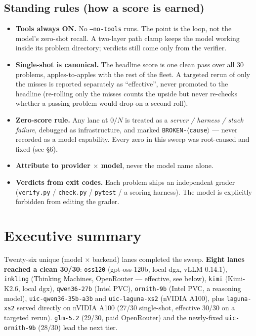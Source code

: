 \documentclass[11pt]{article}
\begin{document}
\subsection*{Standing rules (how a score is earned)}
\begin{itemize}
\item \textbf{Tools always ON.} No \texttt{--no-tools} runs. The point is the loop,
  not the model's zero-shot recall. A two-layer path clamp keeps the model working
  inside its problem directory; verdicts still come only from the verifier.
\item \textbf{Single-shot is canonical.} The headline score is one clean pass over
  all 30 problems, apples-to-apples with the rest of the fleet. A targeted rerun of
  only the misses is reported separately as ``effective'', never promoted to the
  headline (re-rolling only the misses counts the upside but never re-checks whether
  a passing problem would drop on a second roll).
\item \textbf{Zero-score rule.} Any lane at $0/N$ is treated as a
  \emph{server / harness / stack failure}, debugged as infrastructure, and marked
  \texttt{BROKEN-$\langle$cause$\rangle$} --- never recorded as a model capability.
  Every zero in this sweep was root-caused and fixed (see \S6).
\item \textbf{Attribute to provider $\times$ model}, never the model name alone.
\item \textbf{Verdicts from exit codes.} Each problem ships an independent grader
  (\texttt{verify.py} / \texttt{check.py} / \texttt{pytest} / a scoring harness). The
  model is explicitly forbidden from editing the grader.
\end{itemize}

\section{Executive summary}

Twenty-six unique (model $\times$ backend) lanes completed the sweep. \textbf{Eight
lanes reached a clean 30/30}: \texttt{oss120} (gpt-oss-120b, local dgx, vLLM 0.14.1),
\texttt{inkling} (Thinking Machines, OpenRouter --- effective, see below),
\texttt{kimi} (Kimi-K2.6, local dgx), \texttt{qwen36-27b} (Intel PVC), \texttt{ornith-9b}
(Intel PVC, a reasoning model), \texttt{uic-qwen36-35b-a3b} and
\texttt{uic-laguna-xs2} (nVIDIA A100), plus \texttt{laguna-xs2} served directly on nVIDIA A100
(27/30 single-shot, effective 30/30 on a targeted rerun). \texttt{glm-5.2} (29/30,
paid OpenRouter) and the newly-fixed \texttt{uic-ornith-9b} (28/30) lead the next
tier.
\end{document}
